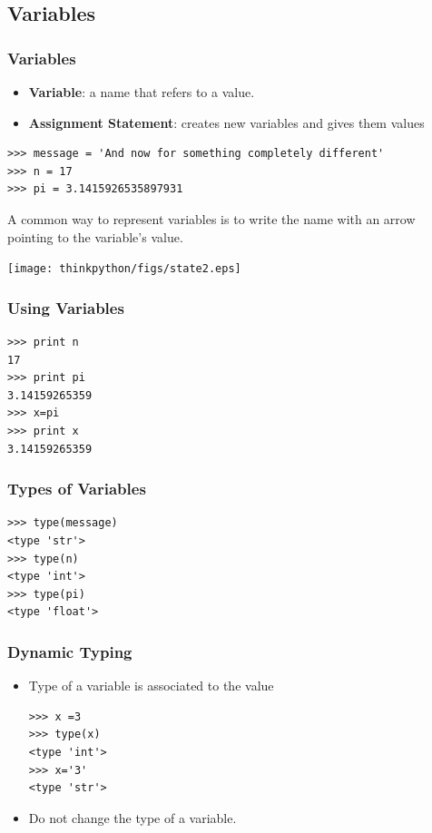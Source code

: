 \documentclass{beamer}
\begin{document}
\subsection{Variables}
\begin{frame}[fragile]
\frametitle{Variables}
\begin{itemize}
\item \textbf{Variable}:  a name that refers to a value.
\item \textbf{Assignment Statement}: creates new variables and gives
them values
\end{itemize}
{\tiny
\begin{verbatim}
>>> message = 'And now for something completely different'
>>> n = 17
>>> pi = 3.1415926535897931
\end{verbatim}}

\vspace*{0.1in}
A common way to represent variables  is to write the name with
an arrow pointing to the variable's value.
\vspace*{0.15in}
\centerline{\texttt{[image: thinkpython/figs/state2.eps]}}
\end{frame}
\begin{frame}[fragile]
\frametitle{Using Variables}
\begin{verbatim}
>>> print n
17
>>> print pi
3.14159265359
>>> x=pi
>>> print x
3.14159265359
\end{verbatim}
\end{frame}
\begin{frame}[fragile]
\frametitle{Types of Variables}
\begin{verbatim}
>>> type(message)
<type 'str'>
>>> type(n)
<type 'int'>
>>> type(pi)
<type 'float'>
\end{verbatim}
\end{frame}
%
%
\begin{frame}[fragile]
\frametitle{Dynamic Typing}
\begin{itemize}
\item Type of a variable is associated to the \alert{value}
\begin{verbatim}
>>> x =3
>>> type(x)
<type 'int'>
>>> x='3'
<type 'str'>
\end{verbatim}
\item  \alert{Do not} change the type of a variable.
\end{itemize}
\end{frame}
%
\end{document}
